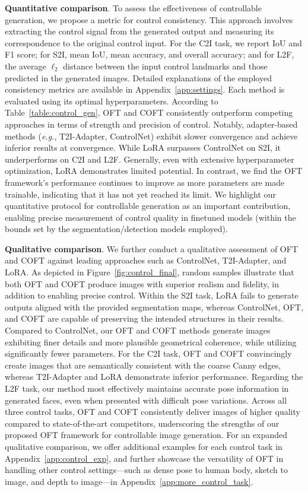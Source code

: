 \textbf{Quantitative comparison}. To assess the effectiveness of controllable generation, we propose a metric for control consistency. This approach involves extracting the control signal from the generated output and measuring its correspondence to the original control input. For the C2I task, we report IoU and F1 score; for S2I, mean IoU, mean accuracy, and overall accuracy; and for L2F, the average $\ell_2$ distance between the input control landmarks and those predicted in the generated images. Detailed explanations of the employed consistency metrics are available in Appendix~\ref{app:settings}. Each method is evaluated using its optimal hyperparameters. According to Table~\ref{table:control_gen}, OFT and COFT consistently outperform competing approaches in terms of strength and precision of control. Notably, adapter-based methods (\emph{e.g.}, T2I-Adapter, ControlNet) exhibit slower convergence and achieve inferior results at convergence. While LoRA surpasses ControlNet on S2I, it underperforms on C2I and L2F. Generally, even with extensive hyperparameter optimization, LoRA demonstrates limited potential. In contrast, we find the OFT framework’s performance continues to improve as more parameters are made trainable, indicating that it has not yet reached its limit. We highlight our quantitative protocol for controllable generation as an important contribution, enabling precise measurement of control quality in finetuned models (within the bounds set by the segmentation/detection models employed).

\textbf{Qualitative comparison}. We further conduct a qualitative assessment of OFT and COFT against leading approaches such as ControlNet, T2I-Adapter, and LoRA. As depicted in Figure~\ref{fig:control_final}, random samples illustrate that both OFT and COFT produce images with superior realism and fidelity, in addition to enabling precise control. Within the S2I task, LoRA fails to generate outputs aligned with the provided segmentation maps, whereas ControlNet, OFT, and COFT are capable of preserving the intended structures in their results. Compared to ControlNet, our OFT and COFT methods generate images exhibiting finer details and more plausible geometrical coherence, while utilizing significantly fewer parameters. For the C2I task, OFT and COFT convincingly create images that are semantically consistent with the coarse Canny edges, whereas T2I-Adapter and LoRA demonstrate inferior performance. Regarding the L2F task, our method most effectively maintains accurate pose information in generated faces, even when presented with difficult pose variations. Across all three control tasks, OFT and COFT consistently deliver images of higher quality compared to state-of-the-art competitors, underscoring the strengths of our proposed OFT framework for controllable image generation. For an expanded qualitative comparison, we offer additional examples for each control task in Appendix~\ref{app:control_exp}, and further showcase the versatility of OFT in handling other control settings—such as dense pose to human body, sketch to image, and depth to image—in Appendix~\ref{app:more_control_task}.

